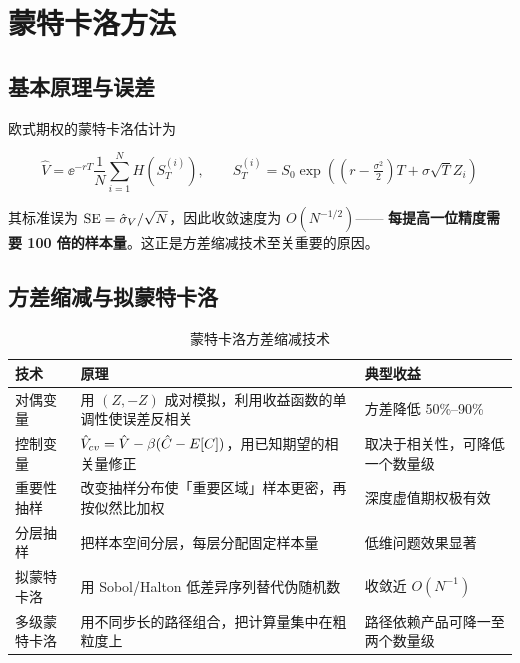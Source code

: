 \section{蒙特卡洛方法}

\subsection{基本原理与误差}

欧式期权的蒙特卡洛估计为

\begin{equation}
  \hat{V} = \ee^{-rT}\frac{1}{N}\sum_{i=1}^{N}H\!\left(S_T^{(i)}\right),
  \qquad
  S_T^{(i)} = S_0\exp\!\left(\left(r-\tfrac{\sigma^2}{2}\right)T+\sigma\sqrt{T}Z_i\right)
  \label{eq:05-mc}
\end{equation}

其标准误为 $\operatorname{SE} = \hat{\sigma}_V/\sqrt{N}$，因此收敛速度为 $O(N^{-1/2})$——
\textbf{每提高一位精度需要 100 倍的样本量}。这正是方差缩减技术至关重要的原因。

\subsection{方差缩减与拟蒙特卡洛}

\begin{table}[htbp]
\centering
\caption{蒙特卡洛方差缩减技术}\label{tab:05-vr}
\tablefont
\begin{tabularx}{\textwidth}{@{}L{2.8cm}Y L{3.6cm}@{}}
\toprule
\textbf{技术} & \textbf{原理} & \textbf{典型收益} \\
\midrule
对偶变量 & 用 $(Z,-Z)$ 成对模拟，利用收益函数的单调性使误差反相关 & 方差降低 50\%--90\% \\
控制变量 & $\hat{V}_{cv} = \hat{V} - \beta(\hat{C}-E[C])$，用已知期望的相关量修正 & 取决于相关性，可降低一个数量级 \\
重要性抽样 & 改变抽样分布使「重要区域」样本更密，再按似然比加权 & 深度虚值期权极有效 \\
分层抽样 & 把样本空间分层，每层分配固定样本量 & 低维问题效果显著 \\
拟蒙特卡洛 & 用 Sobol/Halton 低差异序列替代伪随机数 & 收敛近 $O(N^{-1})$ \\
多级蒙特卡洛 & 用不同步长的路径组合，把计算量集中在粗粒度上 & 路径依赖产品可降一至两个数量级 \\
\bottomrule
\end{tabularx}
\end{table}

